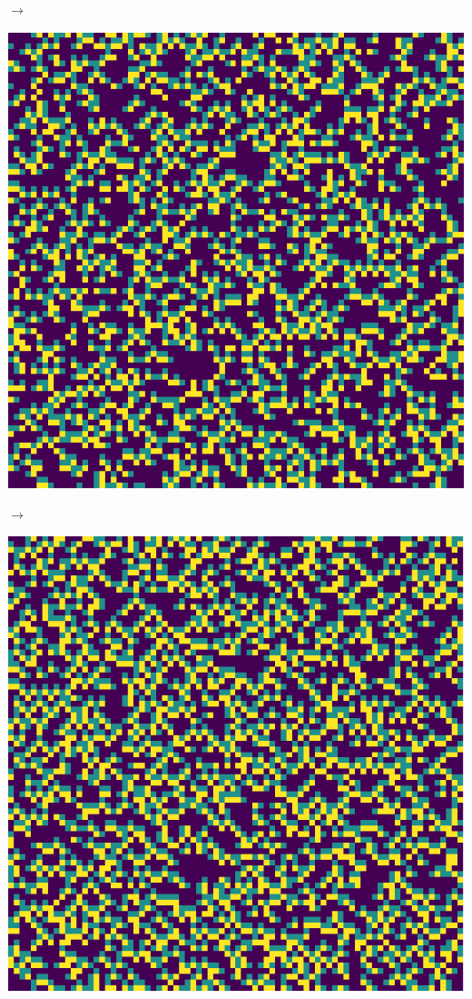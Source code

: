 \documentclass[12pt, a4paper]{article}
\begin{document}
\begin{center}
\begin{minipage}{.17\linewidth}
            \end{minipage}
            $\rightarrow$
            \begin{minipage}{.17\linewidth}
                \includegraphics[scale=0.15]{img/part1/step3.png}
            \end{minipage}
            $\rightarrow$
            \begin{minipage}{.17\linewidth}
                \includegraphics[scale=0.15]{img/part1/step4.png}

\end{minipage}
\end{center}
\end{document}
